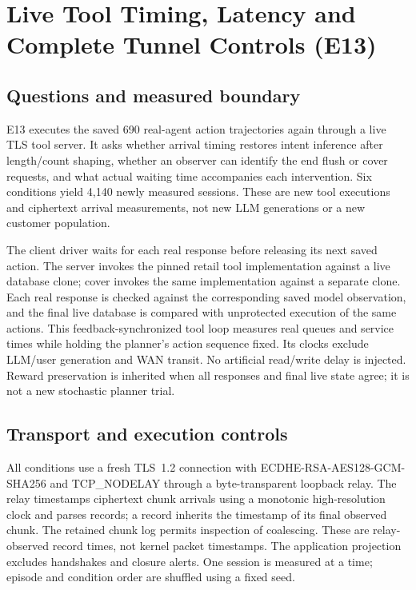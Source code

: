 \section{Live Tool Timing, Latency and Complete Tunnel Controls (E13)}\label{sec:r6-supp}
\subsection{Questions and measured boundary}
E13 executes the saved 690 real-agent action trajectories again through a live TLS tool server. It asks whether arrival timing restores intent inference after length/count shaping, whether an observer can identify the end flush or cover requests, and what actual waiting time accompanies each intervention. Six conditions yield 4,140 newly measured sessions. These are new tool executions and ciphertext arrival measurements, not new LLM generations or a new customer population.

The client driver waits for each real response before releasing its next saved action. The server invokes the pinned retail tool implementation against a live database clone; cover invokes the same implementation against a separate clone. Each real response is checked against the corresponding saved model observation, and the final live database is compared with unprotected execution of the same actions. This feedback-synchronized tool loop measures real queues and service times while holding the planner's action sequence fixed. Its clocks exclude LLM/user generation and WAN transit. No artificial read/write delay is injected. Reward preservation is inherited when all responses and final live state agree; it is not a new stochastic planner trial.

\subsection{Transport and execution controls}
All conditions use a fresh TLS~1.2 connection with ECDHE-RSA-AES128-GCM-SHA256 and TCP\_NODELAY through a byte-transparent loopback relay. The relay timestamps ciphertext chunk arrivals using a monotonic high-resolution clock and parses records; a record inherits the timestamp of its final observed chunk. The retained chunk log permits inspection of coalescing. These are relay-observed record times, not kernel packet timestamps. The application projection excludes handshakes and closure alerts. One session is measured at a time; episode and condition order are shuffled using a fixed seed.

